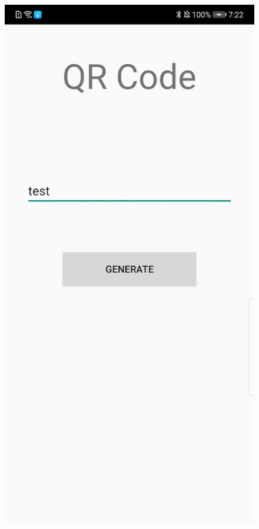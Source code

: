 \documentclass[12pt, a4paper]{article}
\theoremstyle{definition}
\begin{document}
\begin{figure}[htbp]
\begin{minipage}[t]{0.2\linewidth}
		\end{minipage}%
		\begin{minipage}[t]{0.2\linewidth}
		\centering
		\includegraphics[width=\linewidth]{6-2.jpeg}

\end{minipage}
\end{figure}
\end{document}
